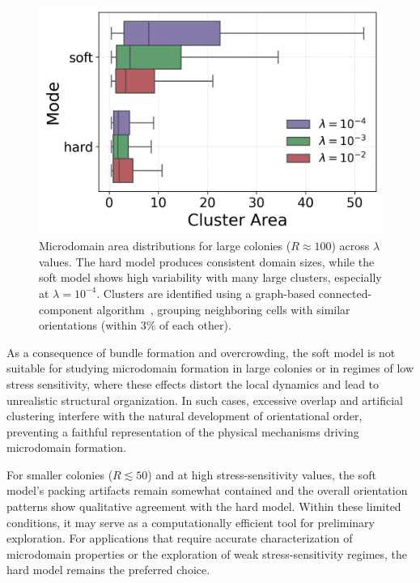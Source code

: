 \documentclass[conference]{IEEEtran}
\begin{document}
\begin{figure}[h]
    \centering
    \includegraphics[width=\linewidth]{figures/comparison_plots/cluster_area_boxplot.png}
    \caption{Microdomain area distributions for large colonies ($R \approx 100$) across $\lambda$ values. The hard model produces consistent domain sizes, while the soft model shows high variability with many large clusters, especially at $\lambda = 10^{-4}$. Clusters are identified using a graph-based connected-component algorithm~\cite{You2018}, grouping neighboring cells with similar orientations (within 3\% of each other).}
    \label{fig:cluster_area_boxplot}
\end{figure}

As a consequence of bundle formation and overcrowding, the soft model is not suitable for studying microdomain formation in large colonies or in regimes of low stress sensitivity, where these effects distort the local dynamics and lead to unrealistic structural organization. In such cases, excessive overlap and artificial clustering interfere with the natural development of orientational order, preventing a faithful representation of the physical mechanisms driving microdomain formation.

For smaller colonies ($R \lesssim 50$) and at high stress-sensitivity values, the
soft model's packing artifacts remain somewhat contained and
the overall orientation patterns show qualitative agreement with the hard model.
Within these limited conditions, it may serve as a computationally efficient tool
for preliminary exploration. For applications that require accurate characterization of microdomain properties or the exploration of weak stress-sensitivity regimes, the hard model remains the preferred choice.
\end{document}

